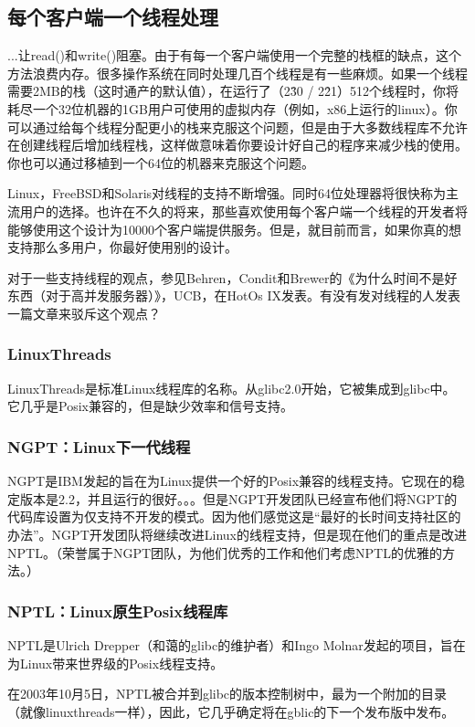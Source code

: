 \documentclass[12pt, twoside, a4paper, xetex]{report}
\begin{document}
\subsection*{每个客户端一个线程处理}
	
	...让read()和write()阻塞。由于有每一个客户端使用一个完整的栈框的缺点，这个方法浪费内存。很多操作系统在同时处理几百个线程是有一些麻烦。如果一个线程需要2MB的栈（这时通产的默认值），在运行了（2\^30 / 2\^21）512个线程时，你将耗尽一个32位机器的1GB用户可使用的虚拟内存（例如，x86上运行的linux）。你可以通过给每个线程分配更小的栈来克服这个问题，但是由于大多数线程库不允许在创建线程后增加线程栈，这样做意味着你要设计好自己的程序来减少栈的使用。你也可以通过移植到一个64位的机器来克服这个问题。

	Linux，FreeBSD和Solaris对线程的支持不断增强。同时64位处理器将很快称为主流用户的选择。也许在不久的将来，那些喜欢使用每个客户端一个线程的开发者将能够使用这个设计为10000个客户端提供服务。但是，就目前而言，如果你真的想支持那么多用户，你最好使用别的设计。

	对于一些支持线程的观点，参见Behren，Condit和Brewer的《为什么时间不是好东西（对于高并发服务器）》，UCB，在HotOs IX发表。有没有发对线程的人发表一篇文章来驳斥这个观点？

\subsubsection*{LinuxThreads}
	LinuxThreads是标准Linux线程库的名称。从glibc2.0开始，它被集成到glibc中。它几乎是Posix兼容的，但是缺少效率和信号支持。

\subsubsection*{NGPT：Linux下一代线程}
	NGPT是IBM发起的旨在为Linux提供一个好的Posix兼容的线程支持。它现在的稳定版本是2.2，并且运行的很好。。。但是NGPT开发团队已经宣布他们将NGPT的代码库设置为仅支持不开发的模式。因为他们感觉这是“最好的长时间支持社区的办法”。NGPT开发团队将继续改进Linux的线程支持，但是现在他们的重点是改进NPTL。（荣誉属于NGPT团队，为他们优秀的工作和他们考虑NPTL的优雅的方法。）

\subsubsection*{NPTL：Linux原生Posix线程库}
	NPTL是Ulrich Drepper（和蔼的glibc的维护者）和Ingo Molnar发起的项目，旨在为Linux带来世界级的Posix线程支持。

	在2003年10月5日，NPTL被合并到glibc的版本控制树中，最为一个附加的目录（就像linuxthreads一样），因此，它几乎确定将在gblic的下一个发布版中发布。
\end{document}
